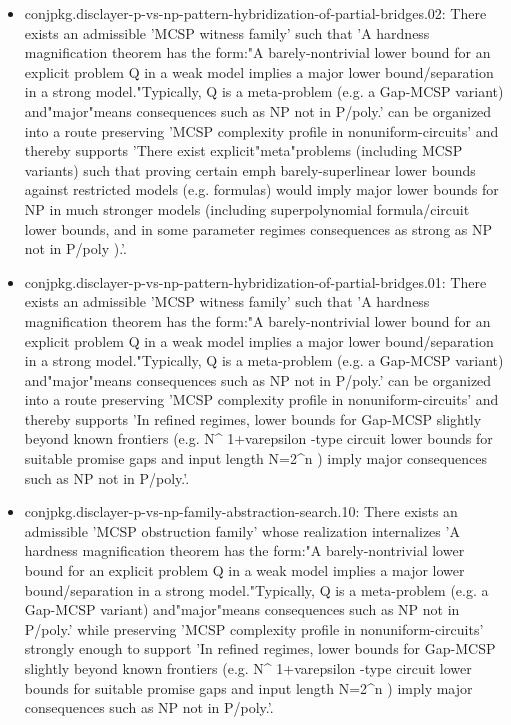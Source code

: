 \documentclass[11pt]{article}
\begin{document}
\begin{itemize}
\item conjpkg.disclayer-p-vs-np-pattern-hybridization-of-partial-bridges.02: There exists an admissible 'MCSP witness family' such that 'A hardness magnification theorem has the form:"A barely-nontrivial lower bound for an explicit problem Q in a weak model implies a major lower bound/separation in a strong model."Typically, Q is a meta-problem (e.g. a Gap-MCSP variant) and"major"means consequences such as NP not in P/poly.' can be organized into a route preserving 'MCSP complexity profile in nonuniform-circuits' and thereby supports 'There exist explicit"meta"problems (including MCSP variants) such that proving certain emph barely-superlinear lower bounds against restricted models (e.g. formulas) would imply major lower bounds for NP in much stronger models (including superpolynomial formula/circuit lower bounds, and in some parameter regimes consequences as strong as NP not in P/poly ).'.
\item conjpkg.disclayer-p-vs-np-pattern-hybridization-of-partial-bridges.01: There exists an admissible 'MCSP witness family' such that 'A hardness magnification theorem has the form:"A barely-nontrivial lower bound for an explicit problem Q in a weak model implies a major lower bound/separation in a strong model."Typically, Q is a meta-problem (e.g. a Gap-MCSP variant) and"major"means consequences such as NP not in P/poly.' can be organized into a route preserving 'MCSP complexity profile in nonuniform-circuits' and thereby supports 'In refined regimes, lower bounds for Gap-MCSP slightly beyond known frontiers (e.g. N\textasciicircum{} 1+varepsilon -type circuit lower bounds for suitable promise gaps and input length N=2\textasciicircum{}n ) imply major consequences such as NP not in P/poly.'.
\item conjpkg.disclayer-p-vs-np-family-abstraction-search.10: There exists an admissible 'MCSP obstruction family' whose realization internalizes 'A hardness magnification theorem has the form:"A barely-nontrivial lower bound for an explicit problem Q in a weak model implies a major lower bound/separation in a strong model."Typically, Q is a meta-problem (e.g. a Gap-MCSP variant) and"major"means consequences such as NP not in P/poly.' while preserving 'MCSP complexity profile in nonuniform-circuits' strongly enough to support 'In refined regimes, lower bounds for Gap-MCSP slightly beyond known frontiers (e.g. N\textasciicircum{} 1+varepsilon -type circuit lower bounds for suitable promise gaps and input length N=2\textasciicircum{}n ) imply major consequences such as NP not in P/poly.'.

\end{itemize}
\end{document}
